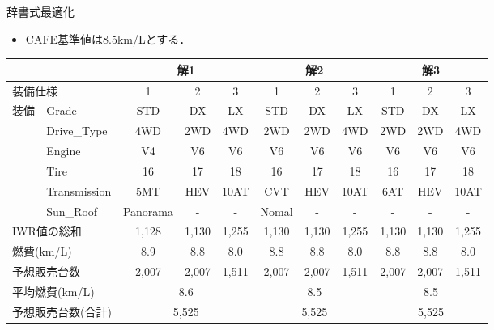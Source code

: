 \documentclass[dvipdfmx, 11pt]{beamer}
\begin{document}
\begin{frame}{辞書式最適化}
 \begin{itemize}
  \item CAFE基準値は8.5km/Lとする．
 \end{itemize}
 \begin{exampleblock}{}
  \tiny
  \centering
    \begin{tabular}{l|l|c|c|c||c|c|c||c|c|c} 
    \multicolumn{2}{l|}{} & \multicolumn{3}{c||}{解1} & \multicolumn{3}{c||}{解2} & \multicolumn{3}{c}{\bf{解3}}\\ \hline
    \multicolumn{2}{l|}{装備仕様} & 1 & 2 & 3 & 1 & 2 & 3 & 1 & 2 & 3 \\ \hline
    装備 & \textsf{Grade}        & \textsf{STD}& \textsf{DX} & \textsf{LX}& \textsf{STD} & \textsf{DX}  & \textsf{LX}    & \textsf{STD} & \textsf{DX}  & \textsf{LX}       \\
        & \textsf{Drive\_Type}  & \textsf{4WD}  & \textsf{2WD} & \textsf{4WD} & \textsf{2WD} & \textsf{2WD} & \textsf{4WD} & \textsf{2WD} & \textsf{2WD} & \textsf{4WD}  \\
        & \textsf{Engine} & \textsf{V4} & \textsf{V6} & \textsf{V6} & \textsf{V6} & \textsf{V6} & \textsf{V6} & \textsf{V6} & \textsf{V6} & \textsf{V6}      \\ 
        & \textsf{Tire} & \textsf{16}	& \textsf{17} & \textsf{18} & \textsf{16}  & \textsf{17}  & \textsf{18} & \textsf{16} & \textsf{17} & \textsf{18} \\
        & \textsf{Transmission} & \textsf{5MT} & \textsf{HEV} & \textsf{10AT} & \textsf{CVT} & \textsf{HEV} & \textsf{10AT}  & \textsf{6AT} & \textsf{HEV} & \textsf{10AT}     \\
        & \textsf{Sun\_Roof} & \textsf{Panorama} & -   & -       & \textsf{Nomal} & -  & -     & -   & -   & -       \\ \hline
    \multicolumn{2}{l|}{IWR値の総和}  & 1,128 & 1,130   & 1,255    & 1,130 & 1,130&1,255  & 1,130& 1,130& 1,255     \\ %
    \multicolumn{2}{l|}{燃費(km/L)}    & 8.9 & 8.8    & 8.0     & 8.8 & 8.8  & 8.0 & 8.8  & 8.8  & 8.0         \\ %
    \multicolumn{2}{l|}{予想販売台数}  & 2,007  & 2,007   & 1,511   & 2,007 & 2,007 & 1,511 & 2,007& 2,007& 1,511       \\ \hline
    \multicolumn{2}{l|}{平均燃費(km/L)} & \multicolumn{3}{c||}{8.6} & \multicolumn{3}{c||}{8.5} & \multicolumn{3}{c}{8.5}\\ 
    \multicolumn{2}{l|}{予想販売台数(合計)}  & \multicolumn{3}{c||}{5,525} & \multicolumn{3}{c||}{5,525}  &\multicolumn{3}{c}{5,525}\\

\end{tabular}
\end{exampleblock}
\end{frame}
\end{document}
